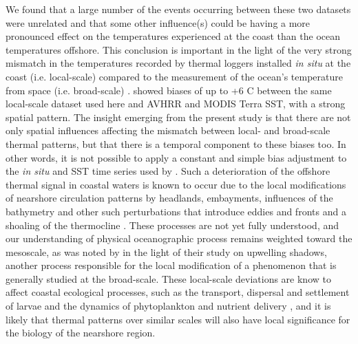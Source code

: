 \documentclass[a4paper,10pt,review]{elsarticle}
\begin{document}
We found that a large number of the events occurring between these two datasets were unrelated and that some other influence(s) could be having a more pronounced effect on the temperatures experienced at the coast than the ocean temperatures offshore. This conclusion is important in the light of the very strong mismatch in the temperatures recorded by thermal loggers installed \emph{in situ} at the coast (i.e. local-scale) compared to the measurement of the ocean's temperature from space (i.e. broad-scale) \citep{Smit2013}. \citet{Smit2013} showed biases of up to +6 \degree C between the same local-scale dataset used here and AVHRR and MODIS Terra SST, with a strong spatial pattern. The insight emerging from the present study is that there are not only spatial influences affecting the mismatch between local- and broad-scale thermal patterns, but that there is a temporal component to these biases too. In other words, it is not possible to apply a constant and simple bias adjustment to the \emph{in situ} and SST time series used by \citet{Smit2013}. Such a deterioration of the offshore thermal signal in coastal waters is known to occur due to the local modifications of nearshore circulation patterns by headlands, embayments, influences of the bathymetry and other such perturbations that introduce eddies and fronts and a shoaling of the thermocline \citep{Okubo1973, Pingree1979, Wolanski1988, Black1990, Grundlingh1991, Graham1997}. These processes are not yet fully understood, and our understanding of physical oceanographic process remains weighted toward the mesoscale, as was noted by \citet{Graham1997} in the light of their study on upwelling shadows, another process responsible for the local modification of a phenomenon that is generally studied at the broad-scale. These local-scale deviations are know to affect coastal ecological processes, such as the transport, dispersal and settlement of larvae \citep{Pineda1994, McCulloch2003, Narvaez2004} and the dynamics of phytoplankton and nutrient delivery \citep{Graham1997, Pineda1994}, and it is likely that thermal patterns over similar scales will also have local significance for the biology of the nearshore region.
\end{document}
